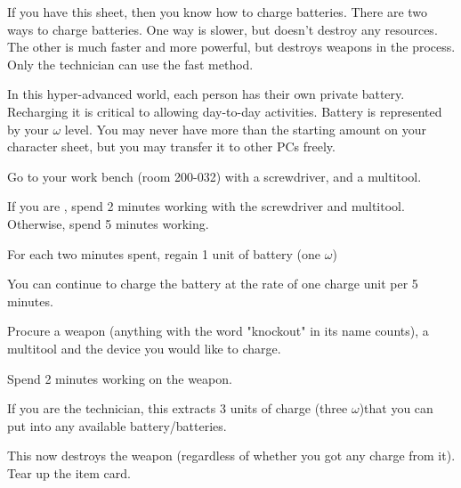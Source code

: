 \documentclass[green]{guildcamp3}
\begin{document}
\name{\gBatterycharge{}}



If you have this sheet, then you know how to charge batteries. There are two ways to charge batteries. One way is slower, but doesn't destroy any resources. The other is much faster and more powerful, but destroys weapons in the process. Only the technician can use the fast method. 

In this hyper-advanced world, each person has their own private battery. Recharging it is critical to allowing day-to-day activities. Battery is represented by your $\omega$ level. You may never have more than the starting amount on your character sheet, but you may transfer it to other PCs freely.


\begin{enum}
  \item Go to your work bench (room 200-032) with a screwdriver, and a multitool.
  \item If you are \cTech{}, spend 2 minutes working with the screwdriver and multitool. Otherwise, spend 5 minutes working.
  \item For each two minutes spent, regain 1 unit of battery (one $\omega$)
  \item You can continue to charge the battery at the rate of one charge unit per 5 minutes. 
\end{enum}

\begin{enum}
	\item Procure a weapon (anything with the word "knockout" in its name counts), a multitool and the device you would like to charge.
	\item Spend 2 minutes working on the weapon. 
	\item If you are the technician, this extracts 3 units of charge (three $\omega$)that you can put into any available battery/batteries. 
	\item This now destroys the weapon (regardless of whether you got any charge from it). Tear up the item card. 
\end{enum}
\end{document}
